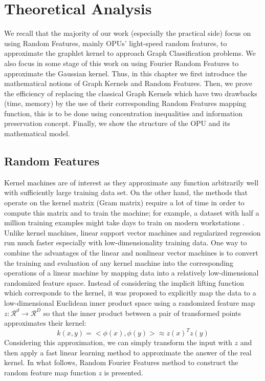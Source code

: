 \addchapheadtotoc
\chapter{Theoretical Analysis}
\label{chapter:analysis}

We recall that the majority of our work (especially the practical side) focus on using Random Features, mainly OPUs' light-speed random features, to approximate the graphlet kernel to approach Graph Classification problems. We also focus in some stage of this work on using Fourier Random Features to approximate the Gaussian kernel. Thus, in this chapter we first introduce the mathematical notions of Graph Kernels and Random Features. Then, we prove the efficiency of replacing the classical Graph Kernels which have two drawbacks (time, memory) by the use of their corresponding Random Features mapping function, this is to be done using concentration inequalities and information preservation concept. Finally, we show the structure of the OPU and its mathematical model. 






\section{Random Features}
Kernel machines are of interest as they approximate any function arbitrarily well with sufficiently large training data set. On the other hand, the methods that operate on the kernel matrix (Gram matrix) require a lot of time in order to compute this matrix and to train the machine; for example, a dataset with half a million training examples might take days to train on modern workstations \citep{rahimi2008random}.
Unlike kernel machines, linear support vector machines and regularized regression run much faster especially with low-dimensionality training data. 
One way to combine the advantages of the linear and nonlinear vector machines is to convert the training and evaluation of any kernel machine into the corresponding operations of a linear machine by mapping data into a relatively low-dimensional randomized feature space.
Instead of considering the implicit lifting function which corresponds to the kernel, it was proposed to explicitly map the data to a low-dimensional Euclidean inner product space using a randomized feature map $z:\mathcal{R}^d \xrightarrow{}\mathcal{R}^D$ so that the inner product between a pair of transformed points approximates their kernel:
\begin{equation}
\label{eq:approx_RF}
k(x,y)=<\phi(x),\phi(y)> \approx z(x)^Tz(y)
\end{equation}
Considering this approximation, we can simply transform the input with $z$ and then apply a fast linear learning method to approximate the answer of the real kernel. \newline
In what follows, Random Fourier Features method to construct the random feature map function $z$ is presented.

